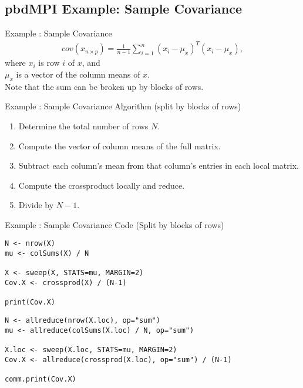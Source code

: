 \subsection{pbdMPI Example: Sample Covariance}
\makesubcontentsslidessec


\begin{frame}
  \begin{block}{Example \countex :  Sample Covariance}\pause
  \begin{align*}
    cov(x_{n\times p}) = \frac{1}{n-1}\sum_{i=1}^n\left(x_i-\mu_x\right)^T\left(x_i-\mu_x\right),
  \end{align*}
  where $x_i$ is row $i$ of $x$, and \\ $\mu_x$ is a vector of the column
  means of $x$. \\[1em]
  Note that the sum can be broken up by blocks of rows.
  \end{block}
\end{frame}


\begin{frame}
  \begin{block}{Example \showex :  Sample Covariance Algorithm (split by blocks of rows)}\pause
    \begin{enumerate}
     \item Determine the total number of rows $N$.
     \item Compute the vector of column means of the full matrix.
     \item Subtract each column's mean from that column's entries in each local matrix.
     \item Compute the crossproduct locally and reduce.
     \item Divide by $N-1$.
    \end{enumerate}
  \end{block}
\end{frame}


\begin{frame}[fragile]
  \begin{exampleblock}{Example \showex :  Sample Covariance Code
      (Split by blocks of rows)}\pause
\begin{lstlisting}[title=Serial Code]
N <- nrow(X)
mu <- colSums(X) / N

X <- sweep(X, STATS=mu, MARGIN=2)
Cov.X <- crossprod(X) / (N-1)

print(Cov.X)
\end{lstlisting}

\begin{lstlisting}[title=Parallel Code]
N <- allreduce(nrow(X.loc), op="sum")
mu <- allreduce(colSums(X.loc) / N, op="sum")

X.loc <- sweep(X.loc, STATS=mu, MARGIN=2)
Cov.X <- allreduce(crossprod(X.loc), op="sum") / (N-1)

comm.print(Cov.X)
\end{lstlisting}
  \end{exampleblock}
\end{frame}

